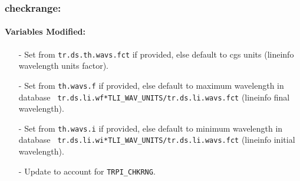 \documentclass[letterpaper,12pt]{article}
\begin{document}
\subsubsection{checkrange:}
\paragraph{Variables Modified:}
\begin{enumerate}[leftmargin=10pt, noitemsep, parsep=0pt, topsep=0ex]
\item[-] Set  from {\tt tr.ds.th.wavs.fct} if
  provided, else default to cgs units (lineinfo wavelength units
  factor).
\item[-] Set  from {\tt th.wavs.f} if
  provided, else default to maximum wavelength in database {\tt
    tr.ds.li.wf*TLI\_WAV\_UNITS/tr.ds.li.wavs.fct} (lineinfo final
  wavelength).
\item[-] Set  from {\tt th.wavs.i} if
  provided, else default to minimum wavelength in database {\tt
    tr.ds.li.wi*TLI\_WAV\_UNITS/tr.ds.li.wavs.fct} (lineinfo initial
  wavelength).
\item[-] Update  to account for {\tt TRPI\_CHKRNG}.
\end{enumerate}
\end{document}
